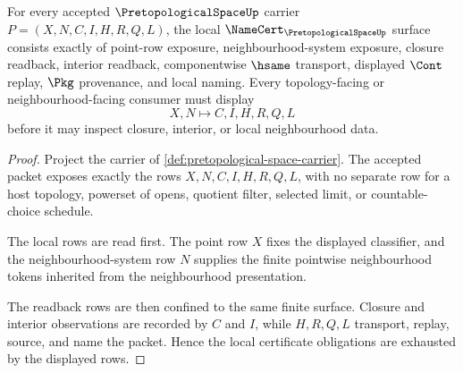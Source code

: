 \begin{theorem}
\label{thm:pretopological-space-namecert-obligations}
For every accepted $\PretopologicalSpaceUp$ carrier $P=(X,N,C,I,H,R,Q,L)$, the local $\NameCert_{\PretopologicalSpaceUp}$ surface consists exactly of point-row exposure, neighbourhood-system exposure, closure readback, interior readback, componentwise $\hsame$ transport, displayed $\Cont$ replay, $\Pkg$ provenance, and local naming. Every topology-facing or neighbourhood-facing consumer must display
$$
X,N \longmapsto C,I,H,R,Q,L
$$
before it may inspect closure, interior, or local neighbourhood data.
\end{theorem}
\begin{proof}
Project the carrier of \autoref{def:pretopological-space-carrier}. The accepted packet exposes exactly the rows $X,N,C,I,H,R,Q,L$, with no separate row for a host topology, powerset of opens, quotient filter, selected limit, or countable-choice schedule.

The local rows are read first. The point row $X$ fixes the displayed classifier, and the neighbourhood-system row $N$ supplies the finite pointwise neighbourhood tokens inherited from the neighbourhood presentation.

The readback rows are then confined to the same finite surface. Closure and interior observations are recorded by $C$ and $I$, while $H,R,Q,L$ transport, replay, source, and name the packet. Hence the local certificate obligations are exhausted by the displayed rows.
\end{proof}

